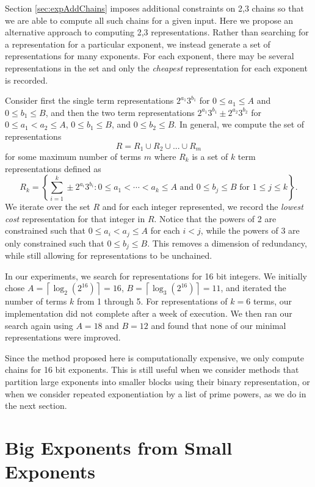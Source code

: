 \documentclass{ucalgthes1}
\theoremstyle{definition}
\newcommand{\ceil}[1]{\left\lceil #1 \right\rceil}
\begin{document}
Section \ref{sec:expAddChains} imposes additional constraints on 2,3 chains so that we are able to compute all such chains for a given input.  Here we propose an alternative approach to computing 2,3 representations.  Rather than searching for a representation for a particular exponent, we instead generate a set of representations for many exponents.  For each exponent, there may be several representations in the set and only the \emph{cheapest} representation for each exponent is recorded.

Consider first the single term representations $2^{a_1}3^{b_1}$ for $0 \le a_1 \le A$ and $0 \le b_1 \le B$, and then the two term representations $2^{a_1}3^{b_1} \pm 2^{a_2}3^{b_2}$ for $0 \le a_1 < a_2 \le A$, $0 \le b_1 \le B$, and $0 \le b_2 \le B$.   In general, we compute the set of representations
\[
R = R_1 \cup R_2 \cup ... \cup R_m
\]
for some maximum number of terms $m$ where $R_k$ is a set of $k$ term representations defined as
\[
R_k = \left\{\sum_{i=1}^k\pm 2^{a_i}3^{b_i} : 0 \le a_1 < \cdots < a_k \le A \textrm{ and } 0 \le b_j \le B \textrm{ for } 1 \le j \le k \right\}.
\]
We iterate over the set $R$ and for each integer represented, we record the \emph{lowest cost} representation for that integer in $R$.  Notice that the powers of 2 are constrained such that $0 \le a_i < a_j \le A$ for each $i < j$, while the powers of 3 are only constrained such that $0 \le b_j \le B$.  This removes a dimension of redundancy, while still allowing for representations to be unchained.

In our experiments, we search for representations for 16 bit integers. We initially chose $A = \ceil{\log_2\left(2^{16}\right)} = 16$, $B = \ceil{\log_3 \left(2^{16}\right)} = 11$, and iterated the number of terms $k$ from 1 through 5. For representations of $k = 6$ terms, our implementation did not complete after a week of execution.  We then ran our search again using $A=18$ and $B=12$ and found that none of our minimal representations were improved.

Since the method proposed here is computationally expensive, we only compute chains for 16 bit exponents.  This is still useful when we consider methods that partition large exponents into smaller blocks using their binary representation, or when we consider repeated exponentiation by a list of prime powers, as we do in the next section.


\section{Big Exponents from Small Exponents}
\label{sec:expBigFromSmall}
\end{document}
